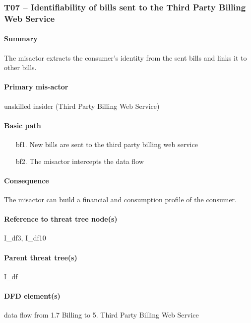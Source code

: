 \subsubsection{T07 -- Identifiability of bills sent to the Third Party Billing Web Service}

\paragraph{Summary} The misactor extracts the consumer's identity from the sent
bills and links it to other bills.

\paragraph{Primary mis-actor} unskilled insider (Third Party Billing Web
Service)

\paragraph{Basic path}
\begin{enumerate}
	\item[bf1.] New bills are sent to the third party billing web service
	\item[bf2.] The misactor intercepts the data flow
\end{enumerate}

\paragraph{Consequence} The misactor can build a financial and consumption
profile of the consumer. 

\paragraph{Reference to threat tree node(s)} I\_df3, I\_df10

\paragraph{Parent threat tree(s)} I\_df

\paragraph{DFD element(s)} data flow from 1.7 Billing to 5. Third Party Billing
Web Service

